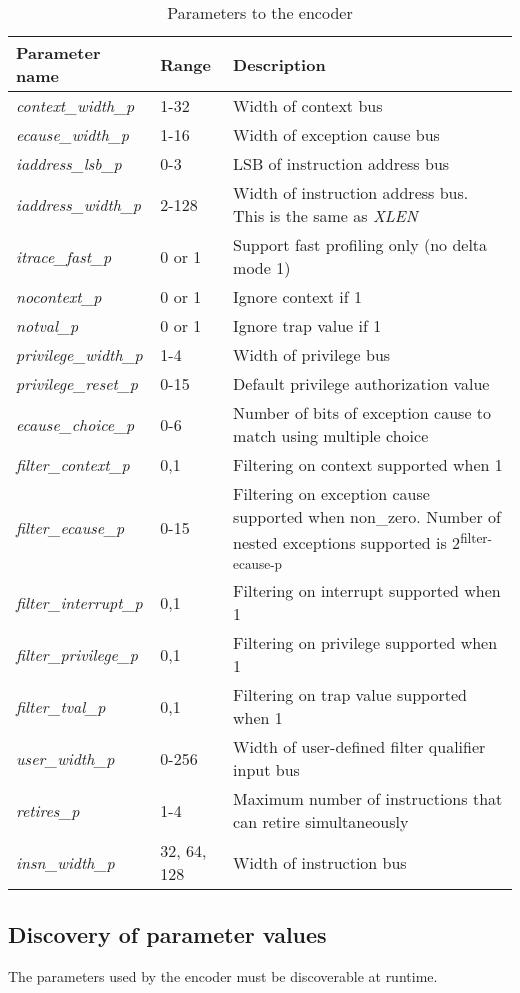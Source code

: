 \begin{table}[htp]
    \centering
    \caption{Parameters to the encoder}
    \label{tab:parameters}
    \begin{tabulary}{\textwidth}{|l|p{25mm}|p{80mm}|}
        \hline
        \textbf {Parameter name} & \textbf {Range} & \textbf {Description} \\
        \hline
        \textit {context\_width\_p} & 1-32 & Width of context bus \\
        \hline
        \textit {ecause\_width\_p} & 1-16 & Width of exception cause bus \\
        \hline
        \textit {iaddress\_lsb\_p} & 0-3 & LSB of instruction address bus \\
        \hline
        \textit {iaddress\_width\_p} & 2-128 & Width of instruction address bus. This is the same as \textit {XLEN}\\
        \hline
        \textit {itrace\_fast\_p} & 0 or 1 & Support fast profiling only (no delta mode 1) \\
        \hline
        \textit {nocontext\_p} & 0 or 1 & Ignore context if 1 \\
        \hline
        \textit {notval\_p} & 0 or 1 & Ignore trap value if 1 \\
        \hline
        \textit {privilege\_width\_p} & 1-4 & Width of privilege bus \\
        \hline
        \textit {privilege\_reset\_p} & 0-15 & Default privilege authorization value \\
        \hline
        \textit {ecause\_choice\_p} & 0-6 & Number of bits of exception cause to match using multiple choice \\
        \hline
        \textit {filter\_context\_p} & 0,1 & Filtering on context supported when 1 \\
        \hline
        \textit {filter\_ecause\_p} & 0-15 & Filtering on exception cause supported when non\_zero.  Number of nested exceptions supported is 2\textsuperscript{filter-ecause-p} \\
        \hline
        \textit {filter\_interrupt\_p} & 0,1 & Filtering on interrupt supported when 1 \\
        \hline
        \textit {filter\_privilege\_p} & 0,1 & Filtering on privilege supported when 1 \\
        \hline
        \textit {filter\_tval\_p} & 0,1 & Filtering on trap value supported when 1 \\
        \hline
        \textit {user\_width\_p} & 0-256 & Width of user-defined filter qualifier input bus \\
        \hline
        \textit {retires\_p} & 1-4 & Maximum number of instructions that can retire simultaneously \\
        \hline
        \textit {insn\_width\_p}	& 32, 64, 128 & Width of instruction bus \\
        \hline
    \end{tabulary}
\end{table}

\subsection {Discovery of parameter values}

The parameters used by the encoder must be discoverable at runtime.
